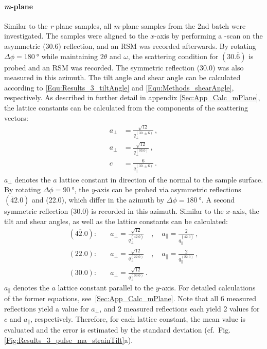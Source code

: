\paragraph{\textit{m}-plane}
    Similar to the \textit{r}-plane samples, all \textit{m}-plane samples from the 2nd batch were investigated.
    The samples were aligned to the $x$-axis by performing a \textphi-scan on the asymmetric (30.6) reflection, and an \gls{RSM} was recorded afterwards.
    By rotating $\Delta\phi=\qty{180}{\degree}$ while maintaining $2\theta$ and $\omega$, the scattering condition for $(30.\overline{6})$ is probed and an \gls{RSM} was recorded.
    The symmetric reflection (30.0) was also measured in this azimuth.
    The tilt angle and shear angle can be calculated according to \eqref{Equ:Results_3_tiltAngle} and \eqref{Equ:Methods_shearAngle}, respectively.
    As described in further detail in appendix \ref{Sec:App_Calc_mPlane}, the lattice constants can be calculated from the components of the scattering vectors:
    \begin{align}
        a_\perp &= \frac{\sqrt{12}}{q_\perp^{(30.\pm6)}} \,,\\
        a_\perp &= \frac{\sqrt{12}}{q_\perp^{(03.0)}}\,,\\
        c &= \frac{6}{q_\parallel^{(30.\pm6)}} \,.
    \end{align}
    $a_\perp$ denotes the $a$ lattice constant in direction of the normal to the sample surface.
    By rotating $\Delta\phi=\qty{90}{\degree}$, the \textit{y}-axis can be probed via asymmetric reflections $(\overline{4}2.0)$ and (22.0), which differ in the azimuth by $\Delta\phi=\qty{180}{\degree}$.
    A second symmetric reflection (30.0) is recorded in this azimuth.
    Similar to the $x$-axis, the tilt and shear angles, as well as the lattice constants can be calculated:
    \begin{align}
        (4\overline{2}.0):&\quad
            a_\perp = \frac{\sqrt{12}}{q_\perp^{(4\overline{2}.0)}}
            \quad,\quad
            a_\parallel = \frac{2}{q_\parallel^{(4\overline{2}.0)}}\,,\\
        (22.0):&\quad
            a_\perp = \frac{\sqrt{12}}{q_\perp^{(22.0)}}
            \quad,\quad
            a_\parallel = \frac{2}{q_\parallel^{(22.0)}}\,,\\
        (30.0):&\quad
            a_\perp = \frac{\sqrt{12}}{q_\perp^{(03.0)}}\,.
    \end{align}
    $a_\parallel$ denotes the $a$ lattice constant parallel to the $y$-axis.
    For detailed calculations of the former equations, see\ \ref{Sec:App_Calc_mPlane}.
    Note that all 6 measured reflections yield a value for $a_\perp$, and 2 measured reflections each yield 2 values for $c$ and $a_\parallel$, respectively.
    Therefore, for each lattice constant, the mean value is evaluated and the error is estimated by the standard deviation (cf.\ Fig.\,\ref{Fig:Results_3_pulse_ma_strainTilt}a).
